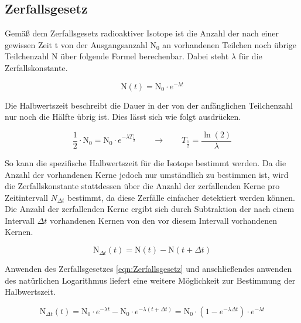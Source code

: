 \documentclass[titlepage = firstcover]{scrartcl}
\begin{document}
        \subsection{Zerfallsgesetz}
            Gemäß dem Zerfallsgesetz radioaktiver Isotope ist die Anzahl der nach einer gewissen Zeit t von der Ausgangsanzahl $\text{N}_0$ an vorhandenen Teilchen noch übrige Teilchenzahl N
            über folgende Formel berechenbar. Dabei steht $\lambda$ für die Zerfallskonstante.
            
            \begin{equation}
                \text{N}(t) = \text{N}_0 \cdot e^{-\lambda t}
                \label{eqn:Zerfallsgesetz}
            \end{equation}

            \noindent
            Die Halbwertszeit beschreibt die Dauer in der von der anfänglichen Teilchenzahl nur noch die Hälfte übrig ist. Dies lässt sich wie folgt ausdrücken.

            \begin{equation*}
                \frac{1}{2} \cdot \text{N}_0 = \text{N}_0 \cdot e^{-\lambda T_{\frac{1}{2}}} \qquad \longrightarrow \qquad T_{\frac{1}{2}} = \frac{\ln(2)}{\lambda}
            \end{equation*}

            \noindent
            So kann die spezifische Halbwertszeit für die Isotope bestimmt werden.
            Da die Anzahl der vorhandenen Kerne jedoch nur umständlich zu bestimmen ist, wird die Zerfallskonstante stattdessen über die Anzahl der zerfallenden Kerne pro Zeitintervall $N_{\Delta t}$
            bestimmt, da diese Zerfälle einfacher detektiert werden können. Die Anzahl der zerfallenden Kerne ergibt sich durch Subtraktion der nach einem Intervall $\Delta t$ vorhandenen Kernen von
            den vor diesem Intervall vorhandenen Kernen.

            \begin{equation*}
                \text{N}_{\Delta t}(t) = \text{N}(t) - \text{N}(t + \Delta t)
            \end{equation*}

            \noindent
            Anwenden des Zerfallsgesetzes \ref{eqn:Zerfallsgesetz} und anschließendes anwenden des natürlichen Logarithmus liefert eine weitere Möglichkeit zur Bestimmung der Halbwertszeit.
            
            \begin{equation*}
                \text{N}_{\Delta t}(t) = \text{N}_0 \cdot e^{-\lambda t} - \text{N}_0 \cdot e^{-\lambda (t + \Delta t)} = \text{N}_0 \cdot \left(1 - e^{-\lambda \Delta t}\right) \cdot e^{-\lambda t} 
            \end{equation*}
                
\end{document}
